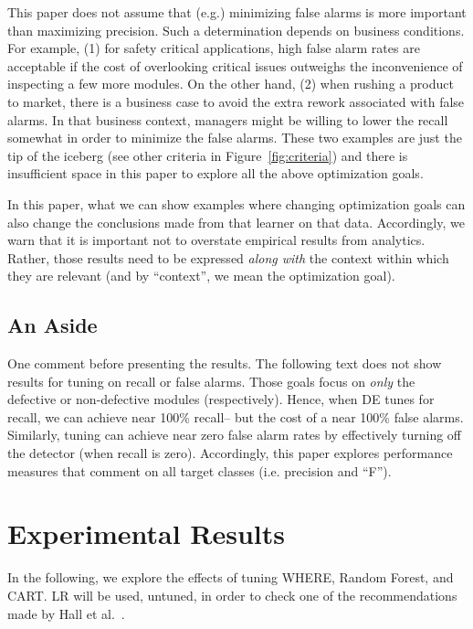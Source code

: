 \documentclass{sig-alternative}
\newcommand{\fig}[1]{Figure~\ref{fig:#1}}
\begin{document}
This paper does not assume that (e.g.) minimizing false alarms is 
more important than maximizing   precision. Such a determination 
depends on   business conditions.
For example,
(1) for safety critical applications, high false alarm rates are  acceptable if the cost
of overlooking  critical issues outweighs the inconvenience of   inspecting a few more
modules. 
On the other hand, (2) when rushing a product to market,  there is a business case to 
avoid the extra rework associated with false alarms.  In that business context, 
managers might be willing to lower the recall somewhat in order to minimize the false alarms.
These two examples are just the tip of the iceberg (see other criteria in \fig{criteria})
and there is insufficient space in this paper to explore all the above optimization goals.

In this paper, what we can  show  examples where  changing  optimization goals can also change 
the conclusions made from that learner on that data. Accordingly, we warn that it is 
important not to overstate  empirical results from  analytics.
Rather, those results need to be expressed {\em along with} the context within which they are
relevant (and by ``context'', we mean the optimization goal).



\subsection{An Aside}

One comment before presenting the results. The following text does not
show results for tuning on recall
or false alarms. Those goals focus on {\em only}
the  defective or non-defective modules (respectively). Hence,
when DE tunes for recall, we can achieve near
100\% recall-- but the cost of a near 100\% false alarms.
Similarly,  tuning
can achieve near zero false alarm rates by effectively turning off
the detector (when recall is zero).
Accordingly,  this paper  explores performance measures that comment on all 
target classes (i.e. precision and ``F''). 




\section{Experimental Results}

In the following, we explore the effects of tuning WHERE, Random Forest,
and CART. LR will be used, untuned, in order to check one of the recommendations
made by Hall et al.~\cite{hall11}.
\end{document}
